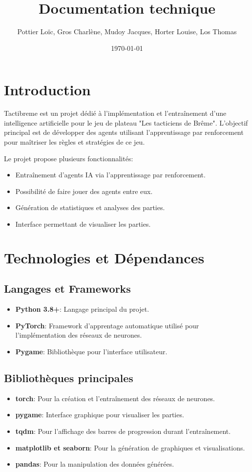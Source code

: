 \documentclass[]{article}
\title{\textbf{Documentation technique}}
\author{Pottier Loïc, Gros Charlène, Mudoy Jacques, Horter Louise, Los Thomas}
\date{\today}
\begin{document}
\maketitle

\tableofcontents

\newpage

\section{Introduction}

Tactibreme est un projet dédié à l'implémentation et l'entraînement d'une intelligence artificielle pour le jeu de plateau "Les tacticiens de Brême". L'objectif principal est de développer des agents utilisant l'apprentissage par renforcement pour maîtriser les règles et stratégies de ce jeu.

Le projet propose plusieurs fonctionnalités:
\begin{itemize}
  \item Entraînement d'agents IA via l'apprentissage par renforcement.
  \item Possibilité de faire jouer des agents entre eux.
  \item Génération de statistiques et analyses des parties.
  \item Interface permettant de visualiser les parties.
\end{itemize}

\section{Technologies et Dépendances}

\subsection{Langages et Frameworks}
\begin{itemize}
  \item \textbf{Python 3.8+}: Langage principal du projet.
  \item \textbf{PyTorch}: Framework d'apprentage automatique utilisé pour l'implémentation des réseaux de neurones.
  \item \textbf{Pygame}: Bibliothèque pour l'interface utilisateur.
\end{itemize}

\subsection{Bibliothèques principales}
\begin{itemize}
  \item \textbf{torch}: Pour la création et l'entraînement des réseaux de neurones.
  \item \textbf{pygame}: Interface graphique pour visualiser les parties.
  \item \textbf{tqdm}: Pour l'affichage des barres de progression durant l'entraînement.
  \item \textbf{matplotlib et seaborn}: Pour la génération de graphiques et visualisations.
  \item \textbf{pandas}: Pour la manipulation des données générées.
\end{itemize}
\end{document}

